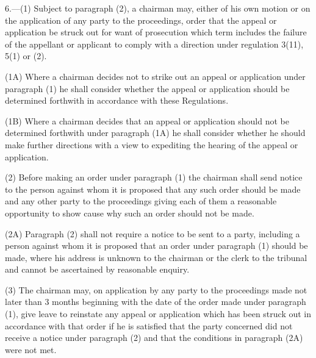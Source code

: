 \documentclass[a4paper]{article}
\begin{document}
6.—(1) Subject to paragraph (2), a chairman may, either of his own motion or on the application of any party to the proceedings, order that the appeal or application be struck out 
for want of prosecution which term includes  %
the failure of the appellant or applicant to comply with 
a direction under regulation 3(11), 5(1) or (2).  %

(1A) Where a chairman decides not to strike out an appeal or application under paragraph (1) he shall consider whether the appeal or application should be determined forthwith in accordance with these Regulations.

(1B) Where a chairman decides that an appeal or application should not be determined forthwith under paragraph (1A) he shall consider whether he should make further directions with a view to expediting the hearing of the appeal or application.

(2) Before making an order under paragraph (1) the chairman shall send notice to the person against whom it is proposed that any such order should be made and any other party to the proceedings giving each of them a reasonable opportunity to show cause why such an order should not be made.

(2A) Paragraph (2) shall not require a notice to be sent to a party, including a person against whom it is proposed that an order under paragraph (1) should be made, where his address is unknown to the chairman or the clerk to the tribunal and cannot be ascertained by reasonable enquiry.

(3) The chairman may, on application by any party to the proceedings made not later than 
3 months  %
beginning with the date of the order made under paragraph (1), give leave to reinstate any appeal or application which has been struck out in accordance with that order
if he is satisfied that the party concerned did not receive a notice under paragraph (2) and that the conditions in paragraph (2A) were not met.  %
\end{document}
